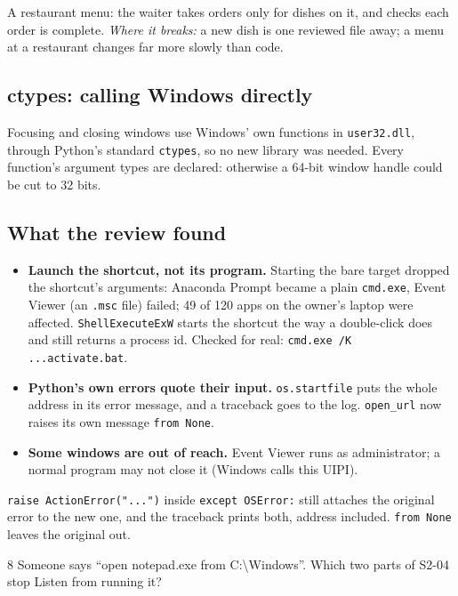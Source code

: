 \documentclass[11pt,a4paper]{article}
\begin{document}
\begin{analogy}
A restaurant menu: the waiter takes orders only for dishes on it, and checks each order is
complete. \emph{Where it breaks:} a new dish is one reviewed file away; a menu at a restaurant
changes far more slowly than code.
\end{analogy}

\subsection{ctypes: calling Windows directly}
Focusing and closing windows use Windows' own functions in \texttt{user32.dll}, through Python's
standard \texttt{ctypes}, so no new library was needed. Every function's argument types are
declared: otherwise a 64-bit window handle could be cut to 32 bits.

\subsection{What the review found}
\begin{itemize}[nosep]
  \item \textbf{Launch the shortcut, not its program.} Starting the bare target dropped the
        shortcut's arguments: Anaconda Prompt became a plain \texttt{cmd.exe}, Event Viewer
        (an \texttt{.msc} file) failed; 49 of 120 apps on the owner's laptop were affected.
        \texttt{ShellExecuteExW} starts the shortcut the way a double-click does and still
        returns a process id. Checked for real: \texttt{cmd.exe /K ...activate.bat}.
  \item \textbf{Python's own errors quote their input.} \texttt{os.startfile} puts the whole
        address in its error message, and a traceback goes to the log. \texttt{open\_url} now
        raises its own message \texttt{from None}.
  \item \textbf{Some windows are out of reach.} Event Viewer runs as administrator; a normal
        program may not close it (Windows calls this UIPI).
\end{itemize}

\begin{caution}
\texttt{raise ActionError("...")} inside \texttt{except OSError:} still attaches the original
error to the new one, and the traceback prints both, address included. \texttt{from None}
leaves the original out.
\end{caution}

\begin{quickcheck}{8}
Someone says ``open notepad.exe from C:\textbackslash Windows''. Which two parts of S2-04 stop
Listen from running it?
\end{quickcheck}
\end{document}
